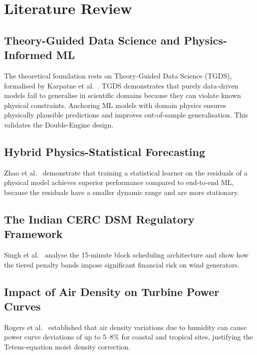 \documentclass[12pt,a4paper]{report}
\begin{document}
\chapter{Literature Review}
\label{ch:litreview}

\section{Theory-Guided Data Science and Physics-Informed ML}

The theoretical foundation rests on Theory-Guided Data Science (TGDS), formalised by
Karpatne et al.~\cite{karpatne2017theory}. TGDS demonstrates that purely data-driven models
fail to generalise in scientific domains because they can violate known physical constraints.
Anchoring ML models with domain physics ensures physically plausible predictions and improves
out-of-sample generalisation. This validates the Double-Engine design.

\section{Hybrid Physics-Statistical Forecasting}

Zhao et al.~\cite{zhao2016hybrid} demonstrate that training a statistical learner on the
residuals of a physical model achieves superior performance compared to end-to-end ML,
because the residuals have a smaller dynamic range and are more stationary.

\section{The Indian CERC DSM Regulatory Framework}

Singh et al.~\cite{singh2020dsm} analyse the 15-minute block scheduling architecture and
show how the tiered penalty bands impose significant financial risk on wind generators.

\section{Impact of Air Density on Turbine Power Curves}

Rogers et al.~\cite{rogers2014airdensity} established that air density variations due to
humidity can cause power curve deviations of up to 5--8\% for coastal and tropical sites,
justifying the Tetens-equation moist density correction.
\end{document}

